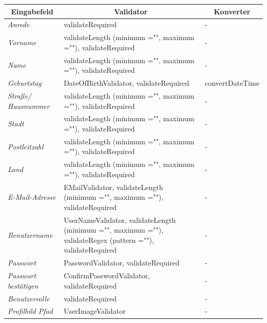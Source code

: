 \begin{itemize}
\begin{center}
\begin{longtable}{|p{3cm} |p{8cm} | p{5cm}|}
						\hline \multicolumn{1}{|c|}{\textbf{Eingabefeld}} & \multicolumn{1}{|c|}{\textbf{Validator}} & \multicolumn{1}{|c|}{\textbf{Konverter}} \\ \hline
						\endfirsthead
						\hline
						\endlastfoot
						\textit{Anrede} & validateRequired & - \\ \hline
						\textit{Vorname} & validateLength (minimum ="", maximum =""), validateRequired & - \\ \hline
						\textit{Name} & validateLength (minimum ="", maximum =""), validateRequired & -  \\ \hline
						\textit{Geburtstag} & DateOfBirthValidator, validateRequired & convertDateTime  \\ \hline
						\textit{Straße/ Hausnummer} & validateLength (minimum ="", maximum =""), validateRequired & - \\ \hline
						\textit{Stadt} & validateLength (minimum ="", maximum =""), validateRequired & -  \\ \hline
						\textit{Postleitzahl} & validateLength (minimum ="", maximum =""), validateRequired & - \\ \hline
						\textit{Land} & validateLength (minimum ="", maximum =""), validateRequired & -  \\ \hline
						\textit{E-Mail-Adresse} & EMailValidator, validateLength (minimum ="", maximum =""), validateRequired & - \\ \hline
						\textit{Benutzername} & UserNameValidator, validateLength (minimum ="", maximum =""), validateRegex (pattern =""), validateRequired  & - \\ \hline
						\textit{Passwort} & PasswordValidator, validateRequired & -  \\ \hline
						\textit{Passwort bestätigen} & ConfirmPasswordValidator, validateRequired & - \\ \hline
						\textit{Benutzerrolle} & validateRequired & - \\ \hline
						\textit{Profilbild Pfad} & UserImageValidator & - \\ \hline
					\end{longtable}
				\end{center}
				

\end{itemize}
